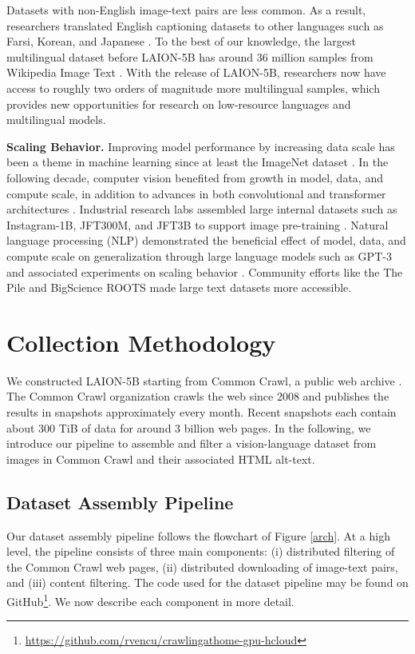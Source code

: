 Datasets with non-English image-text pairs are less common. As a result, researchers translated English captioning datasets to other languages such as Farsi, Korean, and Japanese \citep{ko-clip, japanese-clip, clip-fa}. To the best of our knowledge, the largest multilingual dataset before LAION-5B has around 36 million samples from Wikipedia Image Text \citep{wit}. With the release of LAION-5B, researchers now have access to roughly two orders of magnitude more multilingual samples, which provides new opportunities for research on low-resource languages and multilingual models.

\textbf{Scaling Behavior.} Improving model performance by increasing data scale has been a theme in machine learning since at least the ImageNet dataset \citep{deng2009imagenet}. In the following decade, computer vision benefited from growth in model, data, and compute scale, in addition to advances in both convolutional and transformer architectures \citep{kolesnikov2020big, dosovitskiy2020image, vaswani2017attention, xiaohua2021scaling}. Industrial research labs assembled large internal datasets such as Instagram-1B, JFT300M, and JFT3B to support image pre-training \citep{mahajan2018exploring, sun2017revisiting, zhai2021scaling}. Natural language processing (NLP) demonstrated the beneficial effect of model, data, and compute scale on generalization through large language models such as GPT-3 \citep{brown2020language} and associated experiments on scaling behavior \citep{kaplan2020scaling}. Community efforts like the The Pile \citep{gao2020pile} and BigScience ROOTS \citep{bigscience_roots} made large text datasets more accessible.

\section{Collection Methodology}
\label{sec:collection_methodology}

We constructed LAION-5B starting from Common Crawl, a public web archive \citep{common_crawl}. The Common Crawl organization crawls the web since 2008 and publishes the results in snapshots approximately every month. Recent snapshots each contain about 300 TiB of data for around 3 billion web pages. In the following, we introduce our pipeline to assemble and filter a vision-language dataset from images in Common Crawl and their associated HTML alt-text.

\subsection{Dataset Assembly Pipeline} Our dataset assembly pipeline follows the flowchart of Figure \ref{arch}.
At a high level, the pipeline consists of three main components: (i) distributed filtering of the Common Crawl web pages, (ii) distributed downloading of image-text pairs, and (iii) content filtering. The code used for the dataset pipeline may be found on GitHub\footnote{\url{https://github.com/rvencu/crawlingathome-gpu-hcloud}}.
We now describe each component in more detail. 

